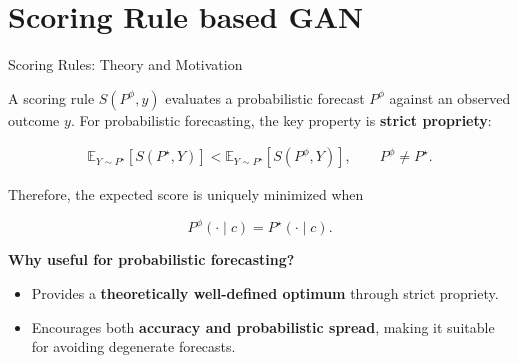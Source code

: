 \section{Scoring Rule based GAN}




\begin{frame}{Scoring Rules: Theory and Motivation}

A scoring rule $S(P^\phi, y)$ evaluates a probabilistic forecast $P^\phi$ against
an observed outcome $y$. For probabilistic forecasting, the key
property is \textbf{strict propriety}:

\begin{equation}
\begin{aligned}
\mathbb{E}_{Y\sim P^\star}
\left[S(P^\star,Y)\right]
<
\mathbb{E}_{Y\sim P^\star}
\left[S(P^\phi,Y)\right],
\qquad
P^\phi \neq P^\star .
\end{aligned}
\end{equation}

\vspace{0.1cm}

Therefore, the expected score is uniquely minimized when

\begin{equation}
P^\phi(\cdot\mid c)=P^\star(\cdot\mid c).
\end{equation}

\vspace{0.3cm}
\textbf{Why useful for probabilistic forecasting?}

\begin{itemize}
    
    \item Provides a \textbf{theoretically well-defined optimum} through
    strict propriety.

    \vspace{0.3cm}
    
    \item Encourages both \textbf{accuracy and probabilistic spread},
    making it suitable for avoiding degenerate forecasts.
    
\end{itemize}

\end{frame}



